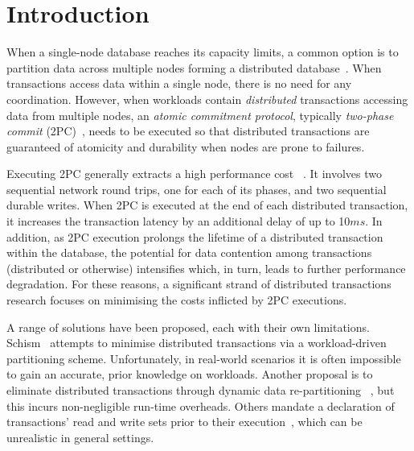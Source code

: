 \section{Introduction}
\label{sec:epoch-intro}

When a single-node database reaches its capacity limits,
a common option is to partition data across multiple nodes forming a
distributed database~\cite{stonebraker}.
When transactions access data within a single node, there is no need for any coordination. %
However, when workloads contain
\emph{distributed} transactions accessing data from multiple nodes,
an \emph{atomic commitment protocol},
typically \emph{two-phase commit} (2PC)~\cite{bernstein}, needs to be executed so that distributed transactions are guaranteed of 
atomicity and durability when nodes are prone to failures. %

Executing 2PC generally extracts a high performance cost 
~\cite{guerraoui,harding}.
It involves two sequential network round trips, one for each of its phases,
and two sequential durable writes. 
When 2PC is executed at the end of each distributed transaction, it increases the transaction latency by an additional delay of up to 10$ms$.
In addition, as 2PC execution prolongs the lifetime of a distributed transaction within the database, 
the potential for data contention among transactions (distributed or otherwise) intensifies  which, in turn, leads to further performance degradation.
For these reasons, a significant strand of distributed transactions research focuses on minimising the costs inflicted by 2PC executions.

A range of solutions have been proposed, each with their own limitations. %
Schism~\cite{curino} attempts to minimise distributed transactions via
a workload-driven partitioning scheme.
Unfortunately, in real-world scenarios it is often impossible to gain an accurate, prior knowledge on workloads.
Another proposal is to eliminate distributed transactions through dynamic data
re-partitioning ~\cite{das,lin}, but this incurs non-negligible run-time overheads.
Others mandate a declaration
of transactions' read and write sets prior to their execution~\cite{thomson,ren}, which can be unrealistic in general settings.

